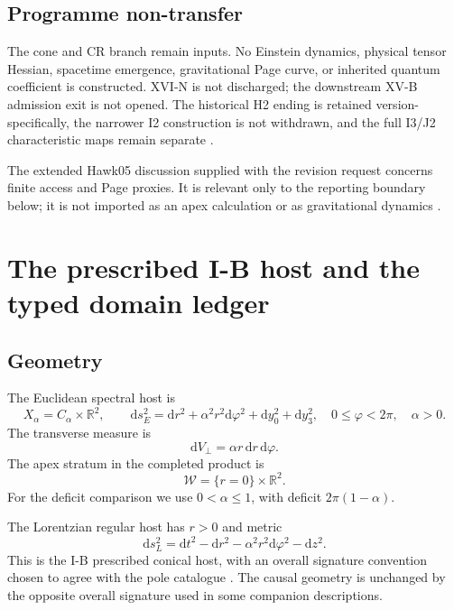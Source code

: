 \documentclass[11pt,a4paper]{article}
\newcommand{\RR}{\mathbb R}
\newcommand{\dd}{\mathrm d}
\newcommand{\WW}{\mathcal W}
\theoremstyle{plain}
\theoremstyle{definition}
\theoremstyle{remark}
\numberwithin{equation}{section}
\begin{document}
\subsection{Programme non-transfer}

The cone and CR branch remain inputs. No Einstein dynamics,
physical tensor Hessian, spacetime emergence, gravitational Page
curve, or inherited quantum coefficient is constructed.
XVI-N is not discharged; the downstream XV-B admission exit is
not opened. The historical H2 ending is retained
version-specifically, the narrower I2 construction is not
withdrawn, and the full I3/J2 characteristic maps remain separate
\cite{CheungN,CheungCharacteristic,CheungXVB}.

The extended Hawk05 discussion supplied with the revision request
concerns finite access and Page proxies. It is relevant only to
the reporting boundary below; it is not imported as an apex
calculation or as gravitational dynamics
\cite{CheungHawk05}.

\section{The prescribed I-B host and the typed domain ledger}
\label{sec:host}

\subsection{Geometry}

The Euclidean spectral host is
\begin{equation}
 X_\alpha=C_\alpha\times\RR^2,\qquad
 \dd s_E^2=\dd r^2+\alpha^2r^2\dd\varphi^2
             +\dd y_0^2+\dd y_3^2,
 \quad 0\le\varphi<2\pi,\quad \alpha>0.
 \label{eq:Euclidean}
\end{equation}
The transverse measure is
\[
 \dd V_\perp=\alpha r\,\dd r\,\dd\varphi.
\]
The apex stratum in the completed product is
\[
 \WW=\{r=0\}\times\RR^2.
\]
For the deficit comparison we use \(0<\alpha\le1\), with deficit
\(2\pi(1-\alpha)\).

The Lorentzian regular host has \(r>0\) and metric
\begin{equation}
 \dd s_L^2=\dd t^2-\dd r^2-\alpha^2r^2\dd\varphi^2-\dd z^2.
 \label{eq:Lorentzian}
\end{equation}
This is the I-B prescribed conical host, with an overall
signature convention chosen to agree with the pole catalogue
\cite{CheungIB}. The causal geometry is unchanged by the
opposite overall signature used in some companion descriptions.
\end{document}

